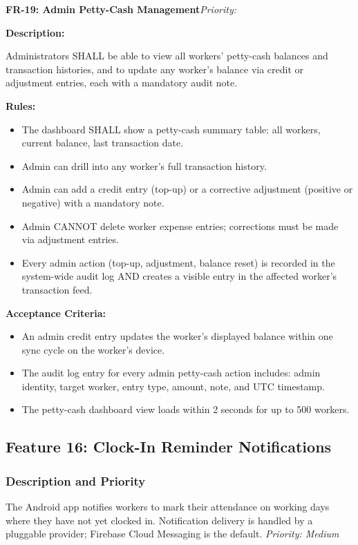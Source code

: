 \documentclass[12pt, a4paper]{article}
\newcommand{\frblock}[2]{%
    \noindent\textbf{#1}\hfill\textit{Priority: #2}%
    \par\smallskip%
}
\newcommand{\srsfield}[1]{\noindent\textbf{#1:}\par}
\begin{document}
\bigskip
\frblock{FR-19: Admin Petty-Cash Management}{}

\srsfield{Description}
Administrators SHALL be able to view all workers' petty-cash balances
and transaction histories, and to update any worker's balance via credit
or adjustment entries, each with a mandatory audit note.

\srsfield{Rules}
\begin{itemize}
    \item The dashboard SHALL show a petty-cash summary table: all
          workers, current balance, last transaction date.
    \item Admin can drill into any worker's full transaction history.
    \item Admin can add a credit entry (top-up) or a corrective
          adjustment (positive or negative) with a mandatory note.
    \item Admin CANNOT delete worker expense entries; corrections must
          be made via adjustment entries.
    \item Every admin action (top-up, adjustment, balance reset) is
          recorded in the system-wide audit log AND creates a visible
          entry in the affected worker's transaction feed.
\end{itemize}

\srsfield{Acceptance Criteria}
\begin{itemize}
    \item An admin credit entry updates the worker's displayed balance
          within one sync cycle on the worker's device.
    \item The audit log entry for every admin petty-cash action includes:
          admin identity, target worker, entry type, amount, note, and
          UTC timestamp.
    \item The petty-cash dashboard view loads within 2 seconds for up
          to 500 workers.
\end{itemize}

\subsection{Feature 16: Clock-In Reminder Notifications}

\subsubsection*{Description and Priority}
The Android app notifies workers to mark their attendance on working days
where they have not yet clocked in. Notification delivery is handled by
a pluggable provider; Firebase Cloud Messaging is the default.
\hfill \textit{Priority: Medium}
\end{document}
